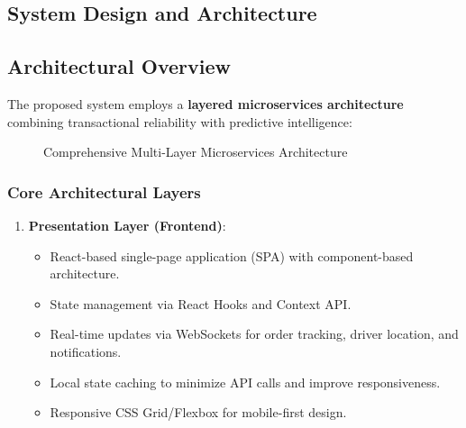 \documentclass[12pt,a4paper]{report}
\begin{document}
\begin{itemize}
\chapter{System Design and Architecture}

\section{Architectural Overview}

The proposed system employs a \textbf{layered microservices architecture} combining transactional reliability with predictive intelligence:

\begin{figure}[H]
\centering
{}
\caption{Comprehensive Multi-Layer Microservices Architecture}
\end{figure}

\subsection{Core Architectural Layers}

\begin{enumerate}
    \item \textbf{Presentation Layer (Frontend)}:
    \begin{itemize}
        \item React-based single-page application (SPA) with component-based architecture.
        \item State management via React Hooks and Context API.
        \item Real-time updates via WebSockets for order tracking, driver location, and notifications.
        \item Local state caching to minimize API calls and improve responsiveness.
        \item Responsive CSS Grid/Flexbox for mobile-first design.
    \end{itemize}
    

\end{enumerate}
\end{itemize}
\end{document}
